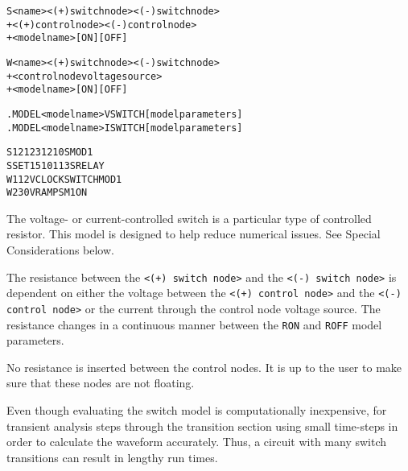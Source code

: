 


\begin{Device}

\device
\begin{alltt}
S<name> <(+) switch node> <(-) switch node>
+ <(+) control node> <(-) control node>
+ <model name> [ON] [OFF]

W<name> <(+) switch node> <(-) switch node>
+ <control node voltage source>
+ <model name> [ON] [OFF]
\end{alltt}

\model
\begin{alltt}
.MODEL <model name> VSWITCH [model parameters]
.MODEL <model name> ISWITCH [model parameters]
\end{alltt}

\examples
\begin{alltt}
S1 21 23 12 10 SMOD1
SSET 15 10 1 13 SRELAY
W1 1 2 VCLOCK SWITCHMOD1
W2 3 0 VRAMP SM1 ON
\end{alltt}

\comments

The voltage- or current-controlled switch is a particular type of
controlled resistor. This model is designed to help reduce numerical
issues. See Special Considerations below.

The resistance between the \texttt{<(+) switch node>} and the
\texttt{<(-) switch node>} is dependent on either the voltage between
the \texttt{<(+) control node>} and the \texttt{<(-) control node>} or
the current through the control node voltage source. The resistance
changes in a continuous manner between the \texttt{RON} and
\texttt{ROFF} model parameters.

No resistance is inserted between the control nodes.  It is up to the
user to make sure that these nodes are not floating.

Even though evaluating the switch model is computationally
inexpensive, for transient analysis \Xyce{} steps through the
transition section using small time-steps in order to calculate the
waveform accurately. Thus, a circuit with many switch transitions can
result in lengthy run times.


\end{Device}
